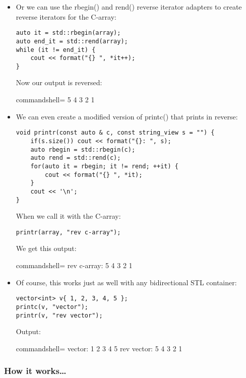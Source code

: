 \begin{itemize}
\item 
Or we can use the rbegin() and rend() reverse iterator adapters to create reverse iterators for the C-array:

\begin{lstlisting}[style=styleCXX]
auto it = std::rbegin(array);
auto end_it = std::rend(array);
while (it != end_it) {
	cout << format("{} ", *it++);
}
\end{lstlisting}

Now our output is reversed:

\begin{tcblisting}{commandshell={}}
5 4 3 2 1
\end{tcblisting}

\item 
We can even create a modified version of printc() that prints in reverse:

\begin{lstlisting}[style=styleCXX]
void printr(const auto & c, const string_view s = "") {
	if(s.size()) cout << format("{}: ", s);
	auto rbegin = std::rbegin(c);
	auto rend = std::rend(c);
	for(auto it = rbegin; it != rend; ++it) {
		cout << format("{} ", *it);
	}
	cout << '\n';
}
\end{lstlisting}

When we call it with the C-array:

\begin{lstlisting}[style=styleCXX]
printr(array, "rev c-array");
\end{lstlisting}

We get this output:

\begin{tcblisting}{commandshell={}}
rev c-array: 5 4 3 2 1
\end{tcblisting}

\item 
Of course, this works just as well with any bidirectional STL container:

\begin{lstlisting}[style=styleCXX]
vector<int> v{ 1, 2, 3, 4, 5 };
printc(v, "vector");
printr(v, "rev vector");
\end{lstlisting}

Output:

\begin{tcblisting}{commandshell={}}
vector: 1 2 3 4 5
rev vector: 5 4 3 2 1
\end{tcblisting}
\end{itemize}


\subsubsection{How it works…}

